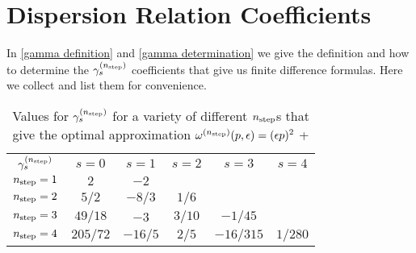 \section{Dispersion Relation Coefficients}\label{sec:coefficients}

In \eqref{gamma definition} and \eqref{gamma determination} we give the definition and how to determine the $\gamma_s^{({n_\text{step}})}$ coefficients that give us finite difference formulas.  Here we collect and list them for convenience.

\begin{table}[ht]
    \caption{Values for $\gamma_s^{({n_\text{step}})}$ for a variety of different ${n_\text{step}}$s that give the optimal approximation $\omega^{({n_\text{step}})}(p,\epsilon) = (\epsilon p)^2$ + }
    \label{tab:dispersion coefficients}
    \begin{tabular}{cccccc}
        $\gamma_s^{({n_\text{step}})}$   &   $s=0$   &   $s=1$   &   $s=2$   &   $s=3$       &   $s=4$   \\
        ${n_\text{step}}=1$              &   $2$     &   $-2$    &           &               &           \\
        ${n_\text{step}}=2$              &   $5/2$   &   $-8/3$  &   $1/6$   &               &           \\
        ${n_\text{step}}=3$              &   $49/18$ &   $-3$    &   $3/10$  &   $-1/45$     &           \\
        ${n_\text{step}}=4$              &   $205/72$&   $-16/5$ &   $2/5$   &   $-16/315$   &   $1/280$
    \end{tabular}
\end{table}
